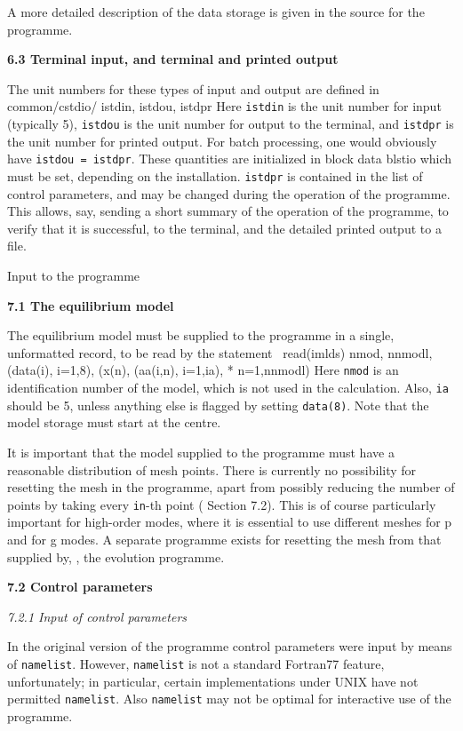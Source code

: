 A more detailed description of the data storage is given in the source
for the programme.

\subsect
{\bf 6.3 Terminal input, and terminal and printed output} 

The unit numbers for these types of input and output
are defined in
\ms
{
\source
common/cstdio/ istdin, istdou, istdpr
}\msni
Here {\tt istdin} is the unit number for input (typically 5),
{\tt istdou} is the unit number for output to the terminal,
and {\tt istdpr} is the unit number for printed output.
For batch processing, one would obviously have
{\tt istdou = istdpr}.
These quantities are initialized in 
\ms
{
\source
block data blstio
}\msni
which must be set, depending on the installation.
{\tt istdpr} is contained in the list of control parameters,
and may be changed during the operation of the programme.
This allows, say, sending a short summary of the operation of
the programme, to verify that it is successful, to the terminal,
and the detailed printed output to a file.

\mainsect
\centerline{ Input to the programme} 

\intsect
{\bf 7.1 The equilibrium model} 

The equilibrium model must be supplied to the programme in a single,
unformatted record, to be read by the statement
\ms
{
\source
\ read(imlds) nmod, nnmodl, (data(i), i=1,8), (x(n), (aa(i,n), i=1,ia),
*  n=1,nnmodl)
}\msni
Here {\tt nmod} is an identification number of the model, which is not
used in the calculation.
Also, {\tt ia} should be 5, unless anything else is flagged by setting
{\tt data(8)}.
Note that the model storage must start at the centre.

It is important that the model supplied to the programme must have a reasonable
distribution of mesh points. There is currently no possibility for
resetting the mesh in the programme, apart from possibly reducing
the number of points by taking every {\tt in}-th point ({\cf} Section 7.2).
This is of course particularly important for high-order
modes, where it is essential to use different meshes for p and
for g modes. A separate programme exists for resetting the mesh
from that supplied by, {\eg}, the evolution programme.

\subsect
{\bf 7.2 Control parameters} 

\intsect
{\it 7.2.1 Input of control parameters} 

In the original version of the programme control parameters were 
input by means of {\tt namelist}.
However, {\tt namelist} is not a standard Fortran77 feature,
unfortunately; in particular, certain implementations
under UNIX have not permitted {\tt namelist}.
Also {\tt namelist} may not be optimal for interactive use
of the programme.

